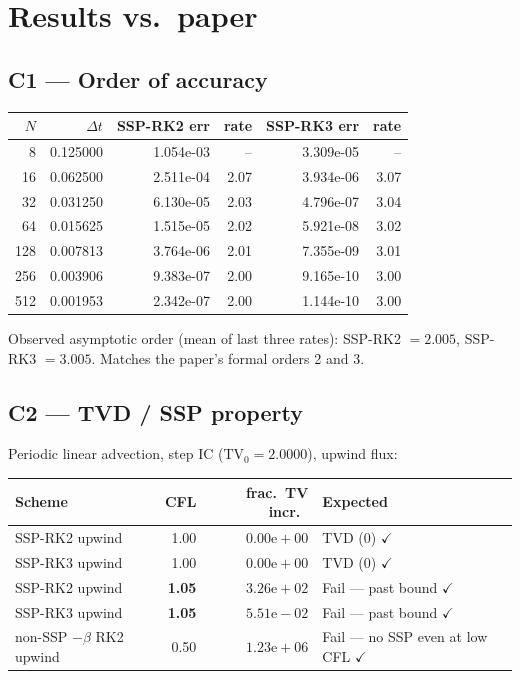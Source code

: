 \documentclass[11pt]{article}
\begin{document}
\section{Results vs.\ paper}

\subsection{C1 --- Order of accuracy}

\begin{center}
\small
\begin{tabular}{rrrrrr}
\toprule
$N$ & $\Delta t$ & SSP-RK2 err & rate & SSP-RK3 err & rate\\
\midrule
  8 & 0.125000 & 1.054e-03 & --   & 3.309e-05 & --  \\
 16 & 0.062500 & 2.511e-04 & 2.07 & 3.934e-06 & 3.07\\
 32 & 0.031250 & 6.130e-05 & 2.03 & 4.796e-07 & 3.04\\
 64 & 0.015625 & 1.515e-05 & 2.02 & 5.921e-08 & 3.02\\
128 & 0.007813 & 3.764e-06 & 2.01 & 7.355e-09 & 3.01\\
256 & 0.003906 & 9.383e-07 & 2.00 & 9.165e-10 & 3.00\\
512 & 0.001953 & 2.342e-07 & 2.00 & 1.144e-10 & 3.00\\
\bottomrule
\end{tabular}
\end{center}

Observed asymptotic order (mean of last three rates): SSP-RK2
$=\mathbf{2.005}$, SSP-RK3 $=\mathbf{3.005}$. Matches the paper's formal
orders 2 and 3.

\subsection{C2 --- TVD / SSP property}

Periodic linear advection, step IC ($\mathrm{TV}_{0} = 2.0000$), upwind
flux:

\begin{center}
\small
\begin{tabular}{lrrl}
\toprule
Scheme & CFL & frac.\ TV incr.\ & Expected\\
\midrule
SSP-RK2 upwind & 1.00 & $0.00\mathrm{e}{+}00$ & TVD (0) $\checkmark$\\
SSP-RK3 upwind & 1.00 & $0.00\mathrm{e}{+}00$ & TVD (0) $\checkmark$\\
SSP-RK2 upwind & \textbf{1.05} & $3.26\mathrm{e}{+}02$ & Fail --- past bound $\checkmark$\\
SSP-RK3 upwind & \textbf{1.05} & $5.51\mathrm{e}{-}02$ & Fail --- past bound $\checkmark$\\
non-SSP $-\beta$ RK2 upwind & 0.50 & $1.23\mathrm{e}{+}06$ & Fail --- no SSP even at low CFL $\checkmark$\\
\bottomrule
\end{tabular}
\end{center}
\end{document}
